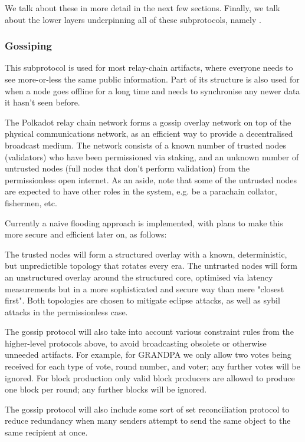 We talk about these in more detail in the next few sections. Finally, we talk about the lower layers underpinning all of these subprotocols, namely .

\subsubsection{Gossiping} \label{sec:gossiping}

This subprotocol is used for most relay-chain artifacts, where everyone needs to see more-or-less the same public information. Part of its structure is also used for when a node goes offline for a long time and needs to synchronise any newer data it hasn't seen before.

The Polkadot relay chain network forms a gossip overlay network on top of the physical communications network, as an efficient way to provide a decentralised broadcast medium. The network consists of a known number of trusted nodes (validators) who have been permissioned via staking, and an unknown number of untrusted nodes (full nodes that don't perform validation) from the permissionless open internet. As an aside, note that some of the untrusted nodes are expected to have other roles in the system, e.g. be a parachain collator, fishermen, etc.

Currently a naive flooding approach is implemented, with plans to make this more secure and efficient later on, as follows:

The trusted nodes will form a structured overlay with a known, deterministic, but unpredictible topology that rotates every era. The untrusted nodes will form an unstructured overlay around the structured core, optimised via latency measurements but in a more sophisticated and secure way than mere "closest first". Both topologies are chosen to mitigate eclipse attacks, as well as sybil attacks in the permissionless case.

The gossip protocol will also take into account various constraint rules from the higher-level protocols above, to avoid broadcasting obsolete or otherwise unneeded artifacts. For example, for GRANDPA we only allow two votes being received for each type of vote, round number, and voter; any further votes will be ignored. For block production only valid block producers are allowed to produce one block per round; any further blocks will be ignored.

The gossip protocol will also include some sort of set reconciliation protocol to reduce redundancy when many senders attempt to send the same object to the same recipient at once.


